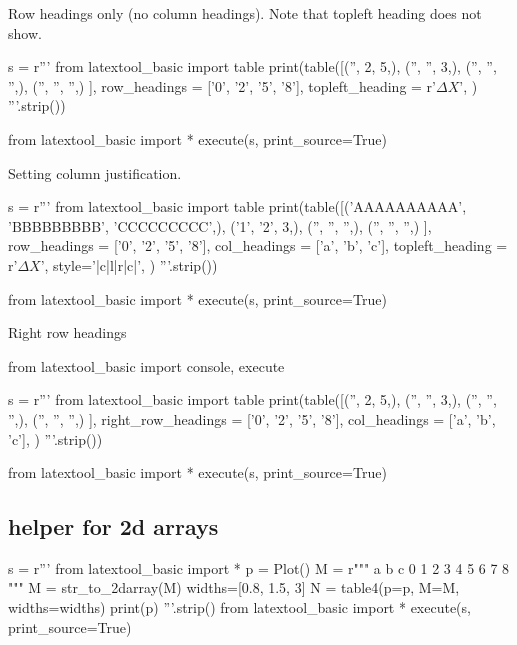 \newpage
Row headings only (no column headings).
Note that topleft heading does not show.

\begin{python}
s = r'''
from latextool_basic import table
print(table([('',  2, 5,),
             ('', '', 3,),
             ('', '', '',),
             ('', '', '',)
            ],
            row_headings = ['0', '2', '5', '8'],
            topleft_heading = r'$\Delta X$',
           )
'''.strip())

from latextool_basic import *
execute(s, print_source=True)
\end{python}






\newpage
Setting column justification.
\begin{python}
s = r'''
from latextool_basic import table
print(table([('AAAAAAAAAA',  'BBBBBBBBB', 'CCCCCCCCC',),
             ('1', '2', 3,),
             ('', '', '',),
             ('', '', '',)
            ],
            row_headings = ['0', '2', '5', '8'],
            col_headings = ['a', 'b', 'c'],
            topleft_heading = r'$\Delta X$',
            style='|c|l|r|c|',
           )
'''.strip())

from latextool_basic import *
execute(s, print_source=True)
\end{python}


\newpage
Right row headings

\begin{python}
from latextool_basic import console, execute

s = r'''
from latextool_basic import table
print(table([('',  2, 5,),
             ('', '', 3,),
             ('', '', '',),
             ('', '', '',)
            ],
            right_row_headings = ['0', '2', '5', '8'],
            col_headings = ['a', 'b', 'c'],
           )
'''.strip())

from latextool_basic import *
execute(s, print_source=True)
\end{python}

\newpage{}
\newpage{}
\newpage{}

\newpage\subsection{helper for 2d arrays}

\begin{python}
s = r'''
from latextool_basic import *
p = Plot()
M = r"""
a b c
0 1 2
3 4 5
6 7 8
"""
M = str_to_2darray(M)
widths=[0.8, 1.5, 3]
N = table4(p=p, M=M, widths=widths)
print(p)
'''.strip()
from latextool_basic import *
execute(s, print_source=True)
\end{python}


